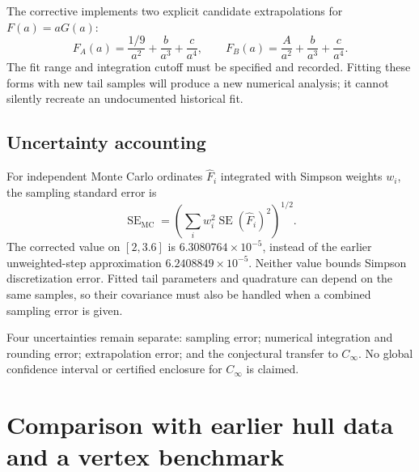 \documentclass[11pt,a4paper]{article}
\begin{document}
The corrective implements two explicit candidate extrapolations for $F(a)=aG(a)$:
\[
 F_A(a)=\frac{1/9}{a^2}+\frac{b}{a^3}+\frac{c}{a^4},\qquad
 F_B(a)=\frac{A}{a^2}+\frac{b}{a^3}+\frac{c}{a^4}.
\]
The fit range and integration cutoff must be specified and recorded. Fitting these forms with new tail samples will produce a new numerical analysis; it cannot silently recreate an undocumented historical fit.

\subsection{Uncertainty accounting}
For independent Monte Carlo ordinates $\widehat F_i$ integrated with Simpson weights $w_i$, the sampling standard error is
\[
 \operatorname{SE}_{\mathrm{MC}}=
 \left(\sum_iw_i^2\operatorname{SE}(\widehat F_i)^2\right)^{1/2}.
\]
The corrected value on $[2,3.6]$ is $6.3080764\times10^{-5}$, instead of the earlier unweighted-step approximation $6.2408849\times10^{-5}$. Neither value bounds Simpson discretization error. Fitted tail parameters and quadrature can depend on the same samples, so their covariance must also be handled when a combined sampling error is given.

Four uncertainties remain separate: sampling error; numerical integration and rounding error; extrapolation error; and the conjectural transfer to $C_\infty$. No global confidence interval or certified enclosure for $C_\infty$ is claimed.

\section{Comparison with earlier hull data and a vertex benchmark}
\end{document}
